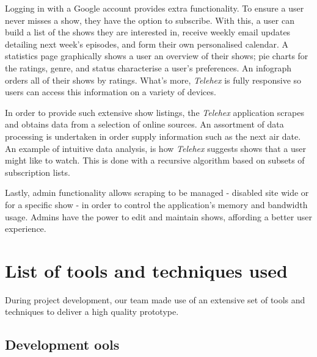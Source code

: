 \documentclass[12pt, a4paper]{article}
\begin{document}
Logging in with a Google account provides extra functionality. To ensure a user never misses a show, they have the option to subscribe. With this, a user can build a list of the shows they are interested in, receive weekly email updates detailing next week's episodes, and form their own personalised calendar. A statistics page graphically shows a user an overview of their shows; pie charts for the ratings, genre, and status characterise a user's preferences. An infograph orders all of their shows by ratings.  What's more, \textit{Telehex} is fully responsive so users can access this information on a variety of devices. 

In order to provide such extensive show listings, the \textit{Telehex} application scrapes and obtains data from a selection of online sources. An assortment of data processing is undertaken in order supply information such as the next air date. An example of intuitive data analysis, is how \textit{Telehex} suggests shows that a user might like to watch. This is done with a recursive algorithm based on subsets of subscription lists. 

Lastly, admin functionality allows scraping to be managed - disabled site wide or for a specific show - in order to control the application's memory and bandwidth usage. Admins have the power to edit and maintain shows, affording a better user experience.
\newpage
\section{List of tools and techniques used}

During project development, our team made use of an extensive set of tools and techniques to deliver a high quality prototype.

\subsection{Development ools}
\end{document}
